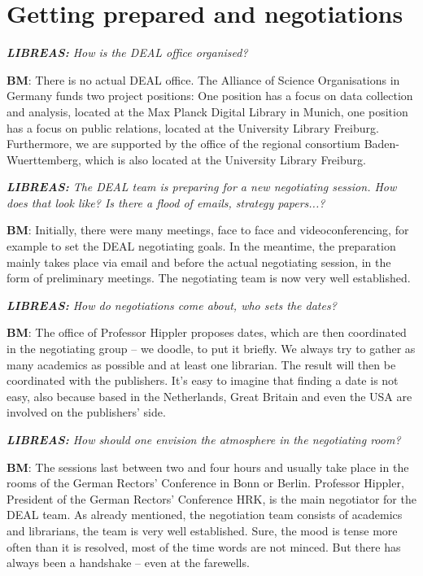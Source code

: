 \documentclass[a4paper,
fontsize=11pt,
oneside,
numbers=noperiodatend,
parskip=half-,
bibliography=totoc,
final
]{scrartcl}
\begin{document}
\hypertarget{getting-prepared-and-negotiations}{%
\section*{Getting prepared and
negotiations}\label{getting-prepared-and-negotiations}}

\emph{\textbf{LIBREAS:} How is the DEAL office organised?}

\textbf{BM}: There is no actual DEAL office. The Alliance of Science
Organisations in Germany funds two project positions: One position has a
focus on data collection and analysis, located at the Max Planck Digital
Library in Munich, one position has a focus on public relations, located
at the University Library Freiburg. Furthermore, we are supported by the
office of the regional consortium Baden-Wuerttemberg, which is also
located at the University Library Freiburg.

\emph{\textbf{LIBREAS:} The DEAL team is preparing for a new negotiating
session. How does that look like? Is there a flood of emails, strategy
papers...?}

\textbf{BM}: Initially, there were many meetings, face to face and
videoconferencing, for example to set the DEAL negotiating goals. In the
meantime, the preparation mainly takes place via email and before the
actual negotiating session, in the form of preliminary meetings. The
negotiating team is now very well established.

\emph{\textbf{LIBREAS:} How do negotiations come about, who sets the
dates?}

\textbf{BM}: The office of Professor Hippler proposes dates, which are
then coordinated in the negotiating group -- we doodle, to put it
briefly. We always try to gather as many academics as possible and at
least one librarian. The result will then be coordinated with the
publishers. It's easy to imagine that finding a date is not easy, also
because based in the Netherlands, Great Britain and even the USA are
involved on the publishers' side.

\emph{\textbf{LIBREAS:} How should one envision the atmosphere in the
negotiating room?}

\textbf{BM}: The sessions last between two and four hours and usually
take place in the rooms of the German Rectors' Conference in Bonn or
Berlin. Professor Hippler, President of the German Rectors' Conference
HRK, is the main negotiator for the DEAL team. As already mentioned, the
negotiation team consists of academics and librarians, the team is very
well established. Sure, the mood is tense more often than it is
resolved, most of the time words are not minced. But there has always
been a handshake -- even at the farewells.
\end{document}
